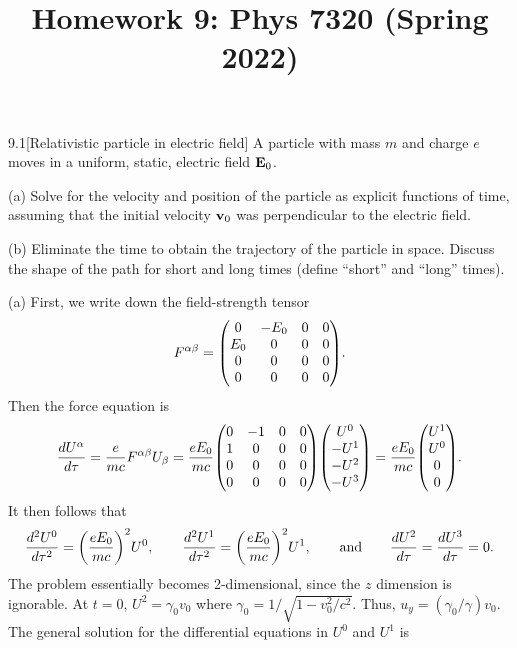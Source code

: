 \documentclass[12pt]{article}
\title{Homework 9: Phys 7320 (Spring 2022)}
\begin{document}
\maketitle
\begin{problem}{9.1}[Relativistic particle in electric field]
A particle with mass $m$ and charge $e$ moves in a uniform, static, electric
field $\vb{E}_0$.

(a) Solve for the velocity and position of the particle as explicit functions of
time, assuming that the initial velocity $\vb{v}_0$ was perpendicular to the
electric field.

(b) Eliminate the time to obtain the trajectory of the particle in space.
Discuss the shape of the path for short and long times (define ``short'' and
``long'' times).
\begin{solution}
(a) First, we write down the field-strength tensor
\begin{equation}
    F^{\alpha\beta}=\mqty(0&-E_0&0&0\\E_0&0&0&0\\0&0&0&0\\0&0&0&0).
\end{equation}
Then the force equation is
\begin{equation}
    \frac{dU^{\alpha}}{d\tau}
    =\frac{e}{mc}F^{\alpha\beta}U_\beta
    =\frac{eE_0}{mc}\mqty(0&-1&0&0\\1&0&0&0\\0&0&0&0\\0&0&0&0)
    \mqty(U^0\\-U^1\\-U^2\\-U^3)
    =\frac{eE_0}{mc}\mqty(U^1\\U^0\\0\\0).
\end{equation}
It then follows that
\begin{equation}
    \frac{d^2U^0}{d\tau^2}=\qty(\frac{eE_0}{mc})^2U^0,\qquad
    \frac{d^2U^1}{d\tau^2}=\qty(\frac{eE_0}{mc})^2U^1,\qquad\text{and}\qquad
    \frac{dU^2}{d\tau}=\frac{dU^3}{d\tau}=0.
\end{equation}
The problem essentially becomes 2-dimensional, since the $z$ dimension is
ignorable. At $t=0$, $U^2=\gamma_0v_0$ where $\gamma_0=1/\sqrt{1-v_0^2/c^2}$.
Thus, $u_y=(\gamma_0/\gamma)v_0$. The general solution for the differential
equations in $U^0$ and $U^1$ is
\begin{subequations}

\end{subequations}
\end{solution}
\end{problem}
\end{document}

